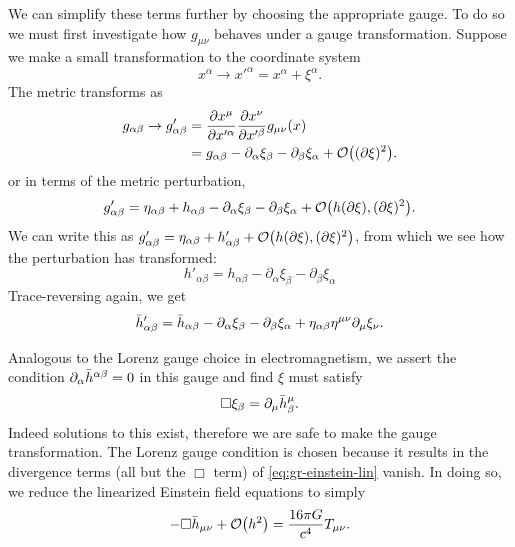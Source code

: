 We can simplify these terms further by choosing the appropriate gauge.
To do so we must first investigate how $g_{\mu\nu}$ behaves under a gauge transformation.
Suppose we make a small transformation to the coordinate system
\begin{equation}
	x^{\alpha} \rightarrow x'^{\alpha} = x^{\alpha} + \xi^{\alpha}.
\end{equation}
The metric transforms as
\begin{align}
	g_{\alpha\beta} \rightarrow g'_{\alpha\beta}
		&= \frac{\partial x^{\mu}}{\partial x'^{\alpha}} \frac{\partial x^{\nu}}{\partial x'^{\beta}} g_{\mu\nu}(x) \\
		&= g_{\alpha\beta} - \partial_{\alpha} \xi_{\beta} - \partial_{\beta} \xi_{\alpha} + \order{(\partial \xi)^2}.
\end{align}
or in terms of the metric perturbation,
\begin{equation}
	g'_{\alpha\beta} = \eta_{\alpha\beta} + h_{\alpha\beta} - \partial_{\alpha} \xi_{\beta} - \partial_{\beta} \xi_{\alpha} + \order{h (\partial \xi), (\partial \xi)^2}.
\end{equation}
We can write this as $g'_{\alpha\beta} = \eta_{\alpha\beta} + h'_{\alpha\beta} + \order{h (\partial \xi), (\partial \xi)^2}$,
from which we see how the perturbation has transformed:
\begin{equation}
	h'_{\alpha\beta} = h_{\alpha\beta} - \partial_{\alpha} \xi_{\beta} - \partial_{\beta} \xi_{\alpha}
\end{equation}
Trace-reversing again, we get
\begin{equation}
	\Bar{h}'_{\alpha\beta} = \Bar{h}_{\alpha\beta} - \partial_{\alpha} \xi_{\beta} - \partial_{\beta} \xi_{\alpha} + \eta_{\alpha\beta} \eta^{\mu\nu} \partial_{\mu} \xi_{\nu}.
\end{equation}

Analogous to the Lorenz gauge choice in electromagnetism, we assert the condition $\partial_{\alpha} \Bar{h}^{\alpha\beta} = 0$ in this gauge and find $\xi$ must satisfy
\begin{equation}
	\Box \xi_{\beta} = \partial_{\mu} \Bar{h}^{\mu}_{\beta}.
\end{equation}
Indeed solutions to this exist, therefore we are safe to make the gauge transformation.
The Lorenz gauge condition is chosen because it results in the divergence terms (all but the $\Box$ term) of \cref{eq:gr-einstein-lin} vanish.
In doing so, we reduce the linearized Einstein field equations to simply
\begin{equation}\label{eq:gr-linear}
	-\Box \Bar{h}_{\mu\nu} + \order{h^2} = \frac{16\pi G}{c^4} T_{\mu\nu}.
\end{equation}

